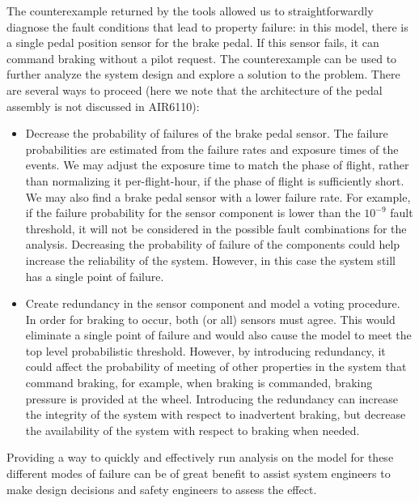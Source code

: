 The counterexample returned by the tools allowed us to straightforwardly diagnose the fault conditions that lead to property failure: in this model, there is a single pedal position sensor for the brake pedal. If this sensor fails, it can command braking without a pilot request. The counterexample can be used to further analyze the system design and explore a solution to the problem. There are several ways to proceed (here we note that the architecture of the pedal assembly is not discussed in AIR6110):
	\begin{itemize}
	\renewcommand{\labelitemi}{\textbullet}
	\item Decrease the probability of failures of the brake pedal sensor. The failure probabilities are estimated from the failure rates and exposure times of the events. We may adjust the exposure time to match the phase of flight, rather than normalizing it per-flight-hour, if the phase of flight is sufficiently short. We may also find a brake pedal sensor with a lower failure rate. For example, if the failure probability for the sensor component is lower than the $10^{-9}$ fault threshold, it will not be considered in the possible fault combinations for the analysis. Decreasing the probability of failure of the components could help increase the reliability of the system. However, in this case the system still has a single point of failure.
	
	\item Create redundancy in the sensor component and model a voting procedure.
	In order for braking to occur, both (or all) sensors must agree. This would eliminate a single point of failure and would also cause the model to meet the top level probabilistic threshold. However, by introducing redundancy, it could affect the probability of meeting of other properties in the system that command braking, for example, when braking is commanded, braking pressure is provided at the wheel. Introducing the redundancy can increase the integrity of the system with respect to inadvertent braking, but decrease the availability of the system with respect to braking when needed.
\end{itemize}

Providing a way to quickly and effectively run analysis on the model %
for these different modes of failure can be of great benefit to assist system engineers to make design decisions and safety engineers to assess the effect.

